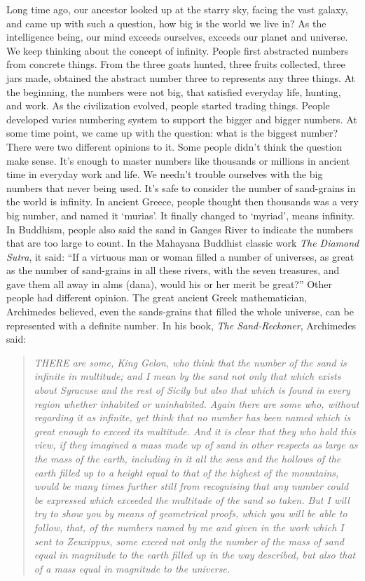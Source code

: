\documentclass{article}
\begin{document}
Long time ago, our ancestor looked up at the starry sky, facing the vast galaxy, and came up with such a question, how big is the world we live in? As the intelligence being, our mind exceeds ourselves, exceeds our planet and universe. We keep thinking about the concept of infinity. People first abstracted numbers from concrete things. From the three goats hunted, three fruits collected, three jars made, obtained the abstract number three to represents any three things. At the beginning, the numbers were not big, that satisfied everyday life, hunting, and work. As the civilization evolved, people started trading things. People developed varies numbering system to support the bigger and bigger numbers. At some time point, we came up with the question: what is the biggest number? There were two different opinions to it. Some people didn't think the question make sense. It's enough to master numbers like thousands or millions in ancient time in everyday work and life. We needn't trouble ourselves with the big numbers that never being used. It's safe to consider the number of sand-grains in the world is infinity. In ancient Greece, people thought then thousands was a very big number, and named it `murias'. It finally changed to `myriad', means infinity\cite{De-linfini-2018}. In Buddhism, people also said the sand in Ganges River to indicate the numbers that are too large to count. In the Mahayana Buddhist classic work {\em The Diamond Sutra}, it said: ``If a virtuous man or woman filled a number of universes, as great as the number of sand-grains in all these rivers, with the seven treasures, and gave them all away in alms (dana), would his or her merit be great?'' Other people had different opinion. The great ancient Greek mathematician, Archimedes believed, even the sands-grains that filled the whole universe, can be represented with a definite number. In his book, {\em The Sand-Reckoner}, Archimedes said:

\begin{quotation}
\itshape
THERE are some, King Gelon, who think that the number of the sand is infinite in multitude; and I mean by the sand not only that which exists about Syracuse and the rest of Sicily but also that which is found in every region whether inhabited or uninhabited. Again there are some who, without regarding it as infinite, yet think that no number has been named which is great enough to exceed its multitude. And it is clear that they who hold this view, if they imagined a mass made up of sand in other respects as large as the mass of the earth, including in it all the seas and the hollows of the earth filled up to a height equal to that of the highest of the mountains, would be many times further still from recognising that any number could be expressed which exceeded the multitude of the sand so taken. But I will try to show you by means of geometrical proofs, which you will be able to follow, that, of the numbers named by me and given in the work which I sent to Zeuxippus, some exceed not only the number of the mass of sand equal in magnitude to the earth filled up in the way described, but also that of a mass equal in magnitude to the universe.
\end{quotation}
\end{document}
